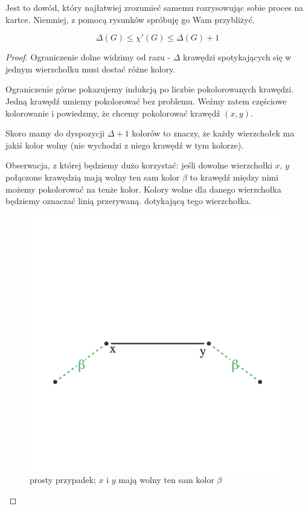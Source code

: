 Jest to dowód, który najłatwiej zrozumieć samemu rozrysowując sobie proces na kartce. Niemniej, z pomocą rysunków spróbuję go Wam przybliżyć.

\begin{theorem}[Vizing]
	$$\Delta(G) \leq \chi'(G) \leq \Delta(G) + 1$$
\end{theorem}

\begin{proof}
	Ograniczenie dolne widzimy od razu - $\Delta$ krawędzi spotykających się w jednym wierzchołku musi dostać różne kolory.

	Ograniczenie górne pokazujemy indukcją po liczbie pokolorowanych krawędzi. Jedną krawędź umiemy pokolorować bez problemu.
	Weźmy zatem częściowe kolorowanie i powiedzmy, że chcemy pokolorować krawędź $(x, y)$.

	Skoro mamy do dyspozycji $\Delta + 1$ kolorów to znaczy, że każdy wierzchołek ma jakiś kolor wolny (nie wychodzi z niego krawędź w tym kolorze).

	Obserwacja, z której będziemy dużo korzystać: jeśli dowolne wierzchołki $x$, $y$ połączone krawędzią mają wolny ten sam kolor $\beta$
	to krawędź między nimi możemy pokolorować na tenże kolor. Kolory wolne dla danego wierzchołka będziemy oznaczać linią przerywaną. dotykającą tego wierzchołka.

	\begin{figure}[ht]
		\centering
		\includegraphics[scale=0.6]{images/vizing/trivial_case.png}
		\caption{prosty przypadek; $x$ i $y$ mają wolny ten sam kolor $\beta$}
	\end{figure}


\end{proof}
